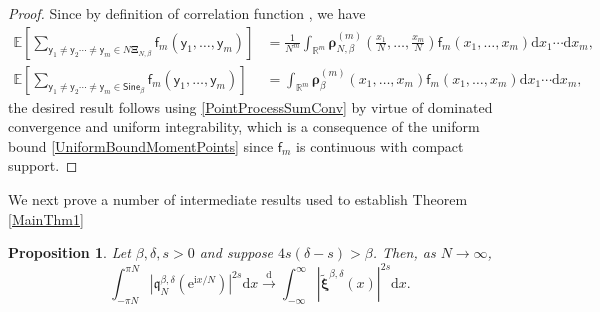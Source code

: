 \documentclass[]{article}
\newtheorem{prop}[thm]{Proposition}
\begin{document}
\begin{proof}
Since by definition of correlation function \cite{BorodinDet,JohanssonDet}, we have
\begin{align*}
  \mathbb{E}\left[\sum_{\mathsf{y}_1\neq \mathsf{y}_2\cdots \neq \mathsf{y}_m \in N \boldsymbol{\Xi}_{N,\beta}}\mathsf{f}_m(\mathsf{y}_1,\dots,\mathsf{y}_m)\right] &=\frac{1}{N^m}\int_{\mathbb{R}^m}\boldsymbol{\rho}_{N,\beta}^{(m)}\left(\frac{x_1}{N},\dots,\frac{x_m}{N}\right)\mathsf{f}_m(x_1,\dots,x_m)\mathrm{d}x_1\cdots\mathrm{d}x_m,\\
  \mathbb{E}\left[\sum_{\mathsf{y}_1\neq \mathsf{y}_2\cdots \neq \mathsf{y}_m \in  \mathsf{Sine}_\beta}\mathsf{f}_m(\mathsf{y}_1,\dots,\mathsf{y}_m)\right]  &=\int_{\mathbb{R}^m}\boldsymbol{\rho}_\beta^{(m)}(x_1,\dots,x_m)\mathsf{f}_m(x_1,\dots,x_m)\mathrm{d}x_1\cdots\mathrm{d}x_m,
\end{align*}
the desired result follows using \eqref{PointProcessSumConv} by virtue of dominated convergence and uniform integrability, which is a consequence of the uniform bound \eqref{UniformBoundMomentPoints} since $\mathsf{f}_m$ is continuous with compact support. 
\end{proof}


We next prove a number of intermediate results used to establish Theorem \ref{MainThm1}


\begin{prop}\label{ConvDistrMoM}
Let $\beta,\delta,s>0$ and suppose $4s(\delta-s)>\beta$. Then, as $N \to \infty$,
\begin{equation}
\int_{-\pi N}^{\pi N} \left|\mathfrak{q}_N^{\beta,\delta}(\mathrm{e}^{\mathrm{i}x/N})\right|^{2s}\mathrm{d}x\overset{\mathrm{d}}{\longrightarrow}\int_{-\infty}^\infty \left|\tilde{\boldsymbol{\xi}}^{\beta,\delta}(x)\right|^{2s}\mathrm{d}x.
\end{equation}
\end{prop}
\end{document}
